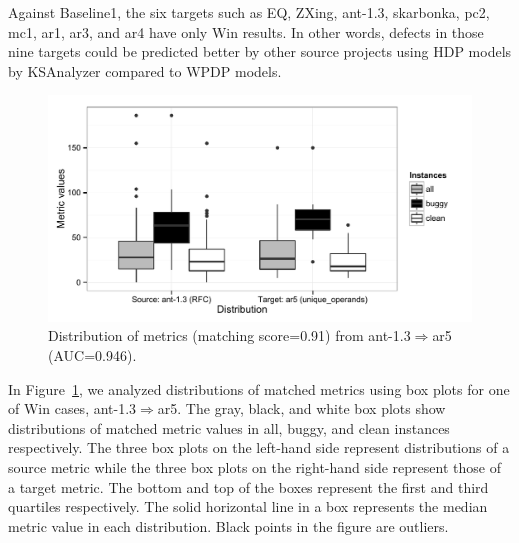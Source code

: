 Against Baseline1, the six targets such as EQ, ZXing, ant-1.3, skarbonka, pc2,
mc1, ar1, ar3, and ar4 have only Win results. In other words, defects in those nine targets
could be predicted better by other source projects using HDP models by
KSAnalyzer compared to WPDP models.

\label{sec:why}
\begin{figure}[t]
	\centering
	\includegraphics[width=\linewidth]{Figures/Result/best_dist_bplot.pdf}
	\caption{Distribution of metrics (matching score=0.91)
	from ant-1.3$\Rightarrow$ar5 (AUC=0.946).}
	\label{fig:best_dist}
\end{figure}

In Figure~\ref{fig:best_dist}, we analyzed distributions of matched metrics using box plots for one of Win cases, ant-1.3$\Rightarrow$ar5.
The gray, black, and white box plots show distributions of matched metric values in
all, buggy, and clean instances respectively. The three box plots on the
left-hand side represent distributions of a source metric while the three
box plots on the right-hand side represent those of a target metric. The
bottom and top of the boxes represent the first and third quartiles
respectively.
The solid horizontal line in a box represents the median metric value in each distribution.
Black points in the figure are outliers.

